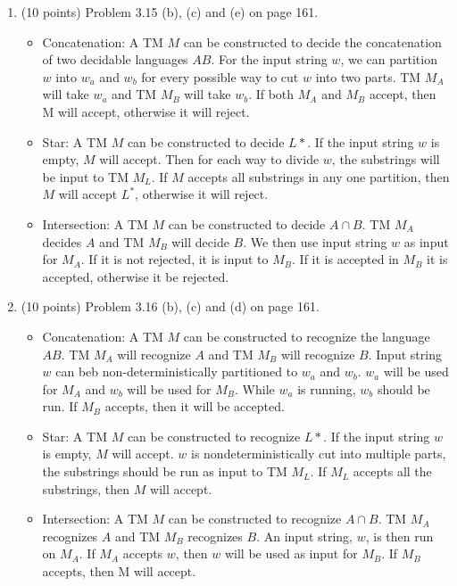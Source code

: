 \documentclass[11pt]{article}
\begin{document}
\begin{enumerate}
  \item (10 points) Problem 3.15 (b), (c) and (e) on page 161.
    \begin{itemize}
     \item Concatenation: A TM $M$ can be constructed to decide the concatenation of two decidable languages $AB$. For the input string
     $w$, we can partition $w$ into $w_a$ and $w_b$ for every possible way to cut $w$ into two parts. TM $M_A$ will take $w_a$ and TM $M_B$ will take $w_b$. If both
     $M_A$ and $M_B$ accept, then M will accept, otherwise it will reject.
     
     \item Star: A TM $M$ can be constructed to decide $L*$. If the input string $w$ is empty, $M$ will accept. Then for each way to divide
     $w$, the substrings will be input to TM $M_L$. If $M$ accepts all substrings in any one partition, then $M$ will accept $L^*$,
     otherwise it will reject.
     
     \item Intersection: A TM $M$ can be constructed to decide $A \cap B$. TM $M_A$ decides $A$ and TM $M_B$ will decide $B$. We then use
     input string $w$ as input for $M_A$. If it is not rejected, it is input to $M_B$. If it is accepted in $M_B$ it is accepted, otherwise
     it be rejected.
    \end{itemize}

      
  \item (10 points) Problem 3.16 (b), (c) and (d) on page 161.
  \begin{itemize}
    \item Concatenation: A TM $M$ can be constructed to recognize the language $AB$. TM $M_A$ will recognize $A$ and TM $M_B$ will
	  recognize $B$. Input string $w$ can beb non-deterministically partitioned to $w_a$ and $w_b$. $w_a$ will be used for $M_A$ and
	  $w_b$ will be used for $M_B$. While $w_a$ is running, $w_b$ should be run. If $M_B$ accepts, then it will be accepted.
    \item Star: A TM $M$ can be constructed to recognize $L*$. If the input string $w$ is empty, $M$ will accept. $w$ is nondeterministically
	  cut into multiple parts, the substrings should be run as input to TM $M_L$. If $M_L$ accepts all the substrings, then $M$ will accept.
    \item Intersection: A TM $M$ can be constructed to recognize $A \cap B$. TM $M_A$ recognizes $A$ and TM $M_B$ recognizes $B$. An input
	  string, $w$, is then run on $M_A$. If $M_A$ accepts $w$, then $w$ will be used as input for $M_B$. If $M_B$ accepts, then M will
	  accept.
  \end{itemize}

\end{enumerate}
\end{document}
